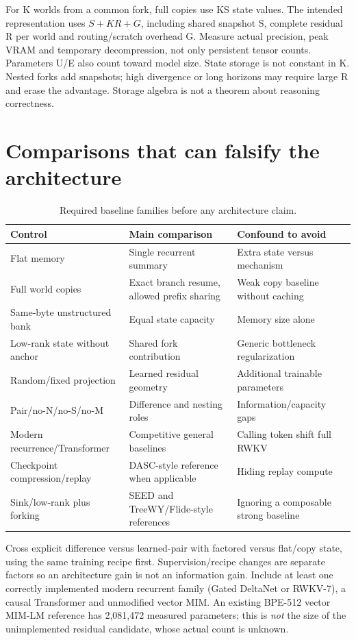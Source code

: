 \documentclass[11pt,a4paper]{article}
\begin{document}
For K worlds from a common fork, full copies use KS state values. The intended
representation uses \(S+KR+G\), including shared snapshot S, complete residual R
per world and routing/scratch overhead G. Measure actual precision, peak VRAM
and temporary decompression, not only persistent tensor counts. Parameters U/E
also count toward model size. State storage is not constant in K. Nested forks
add snapshots; high divergence or long horizons may require large R and erase
the advantage. Storage algebra is not a theorem about reasoning correctness.

\section{Comparisons that can falsify the architecture}
\begin{table}[ht]\centering\small
\caption{Required baseline families before any architecture claim.}
\begin{tabularx}{\linewidth}{lYY}\toprule
Control & Main comparison & Confound to avoid\\\midrule
Flat memory & Single recurrent summary & Extra state versus mechanism\\
Full world copies & Exact branch resume, allowed prefix sharing & Weak copy baseline without caching\\
Same-byte unstructured bank & Equal state capacity & Memory size alone\\
Low-rank state without anchor & Shared fork contribution & Generic bottleneck regularization\\
Random/fixed projection & Learned residual geometry & Additional trainable parameters\\
Pair/no-N/no-S/no-M & Difference and nesting roles & Information/capacity gaps\\
Modern recurrence/Transformer & Competitive general baselines & Calling token shift full RWKV\\
Checkpoint compression/replay & DASC-style reference when applicable & Hiding replay compute\\
Sink/low-rank plus forking & SEED and TreeWY/Flide-style references & Ignoring a composable strong baseline\\
\bottomrule\end{tabularx}\end{table}

Cross explicit difference versus learned-pair with factored versus flat/copy state,
using the same training recipe first. Supervision/recipe changes are separate
factors so an architecture gain is not an information gain. Include at least
one correctly implemented modern recurrent family (Gated DeltaNet or RWKV-7),
a causal Transformer and unmodified vector MIM. An existing BPE-512 vector
MIM-LM reference has 2,081,472 measured parameters; this is \emph{not} the size
of the unimplemented residual candidate, whose actual count is unknown.
\end{document}
